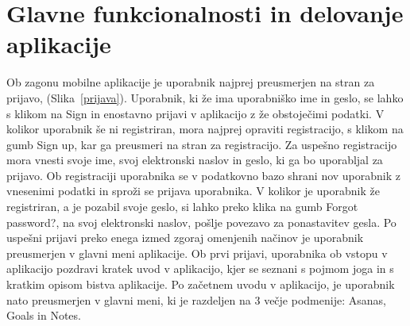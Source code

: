\documentclass[a4paper, 12pt]{book}
\begin{document}
\section{Glavne funkcionalnosti in delovanje aplikacije}
Ob zagonu mobilne aplikacije je uporabnik najprej preusmerjen na stran za prijavo, (Slika~\ref{prijava}). Uporabnik, ki že ima uporabniško ime in geslo, se lahko s klikom na Sign in enostavno prijavi v aplikacijo z že obstoječimi podatki. V kolikor uporabnik še ni registriran, mora najprej opraviti registracijo, s klikom na gumb Sign up, kar ga preusmeri na stran za registracijo. Za uspešno registracijo mora vnesti svoje ime, svoj elektronski naslov in geslo, ki ga bo uporabljal za prijavo. Ob registraciji uporabnika se v podatkovno bazo shrani nov uporabnik z vnesenimi podatki in sproži se prijava uporabnika. V kolikor je uporabnik že registriran, a je pozabil svoje geslo, si lahko preko klika na gumb Forgot password?, na svoj elektronski naslov, pošlje povezavo za ponastavitev gesla. Po uspešni prijavi preko enega izmed zgoraj omenjenih načinov je uporabnik preusmerjen v glavni meni aplikacije. Ob prvi prijavi, uporabnika ob vstopu v aplikacijo pozdravi kratek uvod v aplikacijo, kjer se seznani s pojmom joga in s kratkim opisom bistva aplikacije. Po začetnem uvodu v aplikacijo, je uporabnik nato preusmerjen v glavni meni, ki je razdeljen na 3 večje podmenije: Asanas, Goals in Notes.\\
\end{document}

